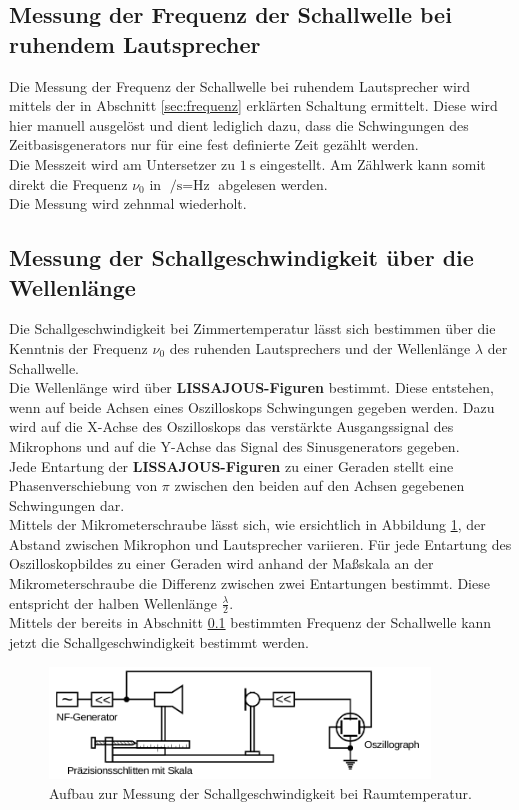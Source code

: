 \FloatBarrier
\subsection{Messung der Frequenz der Schallwelle bei ruhendem Lautsprecher}
\label{sec:schall} %
Die Messung der Frequenz der Schallwelle bei ruhendem Lautsprecher wird mittels der in Abschnitt \ref{sec:frequenz} erklärten Schaltung ermittelt.
Diese wird hier manuell ausgelöst und dient lediglich dazu, dass die Schwingungen des Zeitbasisgenerators nur für eine fest definierte Zeit gezählt werden.\\
Die Messzeit wird am Untersetzer zu $\SI{1}{\second}$ eingestellt. Am Zählwerk kann somit direkt die Frequenz $\nu_{\mathrm{0}}$ in $\si{\per\second}=\si{\Hz}$ abgelesen werden.\\
Die Messung wird zehnmal wiederholt.
\subsection{Messung der Schallgeschwindigkeit über die Wellenlänge}
Die Schallgeschwindigkeit bei Zimmertemperatur lässt sich bestimmen über die Kenntnis der Frequenz $\nu_{\mathrm{0}}$ des ruhenden Lautsprechers und der Wellenlänge $\lambda$ der Schallwelle.\\
Die Wellenlänge wird über \textbf{LISSAJOUS-Figuren} bestimmt.
Diese entstehen, wenn auf beide Achsen eines Oszilloskops Schwingungen gegeben werden. Dazu wird auf die X-Achse des Oszilloskops das verstärkte Ausgangssignal des Mikrophons und auf die Y-Achse das Signal des Sinusgenerators gegeben.\\
Jede Entartung der \textbf{LISSAJOUS-Figuren} zu einer Geraden stellt eine Phasenverschiebung von $\pi$ zwischen den beiden auf den Achsen gegebenen Schwingungen dar.\\
Mittels der Mikrometerschraube lässt sich, wie ersichtlich in Abbildung \ref{fig:lisa}, der Abstand zwischen Mikrophon und Lautsprecher variieren.
Für jede Entartung des Oszilloskopbildes zu einer Geraden wird anhand
der Maßskala an der Mikrometerschraube die Differenz zwischen zwei Entartungen bestimmt. Diese entspricht der halben Wellenlänge $\frac{\lambda}{2}$.\\
Mittels der bereits in Abschnitt \ref{sec:schall} bestimmten Frequenz der Schallwelle kann jetzt die Schallgeschwindigkeit bestimmt werden.

\begin{figure}
	\centering
	\includegraphics[width=0.9\textwidth]{Bilder/lissajou.png}
	\caption{Aufbau zur Messung der Schallgeschwindigkeit bei Raumtemperatur. \cite{Anleitung}}
	\label{fig:lisa}
\end{figure}

